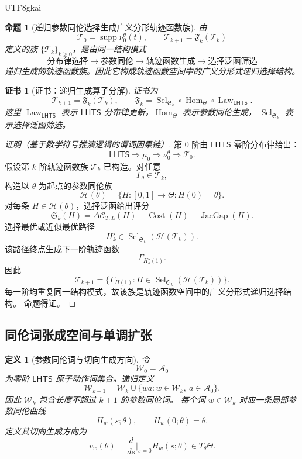 \documentclass[12pt]{article}
\newtheorem{definition}{定义}[section]
\newtheorem{proposition}{命题}[section]
\newtheorem{Certificate}{证书}[section]
\newcommand{\LHTS}{\ensuremath{\mathsf{LHTS}}}
\DeclareMathOperator{\Cost}{Cost}
\DeclareMathOperator{\JacGap}{JacGap}
\DeclareMathOperator{\Law}{Law}
\DeclareMathOperator{\Sel}{Sel}
\DeclareMathOperator{\Hom}{Hom}
\DeclareMathOperator{\supp}{supp}
\begin{document}
\begin{CJK*}{UTF8}{gkai}
\begin{proposition}[递归参数同伦选择生成广义分形轨迹函数族]
\label{prop:tex57-recursive-selection-fractal}
由
\[
  \mathcal T_0=\supp\nu_0^\theta(t),
  \qquad
  \mathcal T_{k+1}=\mathfrak F_k(\mathcal T_k)
\]
定义的族 \(\{\mathcal T_k\}_{k\ge0}\)，是由同一结构模式
\[
  \text{分布律选择}
  \to
  \text{参数同伦}
  \to
  \text{轨迹函数生成}
  \to
  \text{选择泛函筛选}
\]
递归生成的轨迹函数族。因此它构成轨迹函数空间中的广义分形式递归选择结构。
\end{proposition}

\begin{Certificate}[证书：递归生成算子分解]
\label{cert:tex57-recursive-selection-fractal}
证书为
\[
\boxed{
\mathcal T_{k+1}
=
\mathfrak F_k(\mathcal T_k),
\qquad
\mathfrak F_k
=
\Sel_{\mathfrak S_k}
\circ
\Hom_{\Theta}
\circ
\Law_{\LHTS}.
}
\]
这里 \(\Law_{\LHTS}\) 表示 \(\LHTS{}\) 分布律更新，\(\Hom_\Theta\) 表示参数同伦生成，
\(\Sel_{\mathfrak S_k}\) 表示选择泛函筛选。
\end{Certificate}

\begin{proof}[证明（基于数学符号推演逻辑的谓词因果链）]
第 \(0\) 阶由 \(\LHTS{}\) 零阶分布律给出：
\[
  \LHTS{}
  \Longrightarrow
  \mu_0
  \Longrightarrow
  \nu_0^\theta
  \Longrightarrow
  \mathcal T_0.
\]
假设第 \(k\) 阶轨迹函数族 \(\mathcal T_k\) 已构造。对任意
\[
  \Gamma_\theta\in\mathcal T_k,
\]
构造以 \(\theta\) 为起点的参数同伦族
\[
  \mathcal H(\theta)
  =
  \{H:[0,1]\to\Theta:H(0)=\theta\}.
\]
对每条 \(H\in\mathcal H(\theta)\)，选择泛函给出评分
\[
  \mathfrak S_k(H)
  =
  \Delta\mathcal C_{T,L}(H)
  -
  \Cost(H)
  -
  \JacGap(H).
\]
选择最优或近似最优路径
\[
  H_k^\star
  \in
  \Sel_{\mathfrak S_k}(\mathcal H(\mathcal T_k)).
\]
该路径终点生成下一阶轨迹函数
\[
  \Gamma_{H_k^\star(1)}.
\]
因此
\[
  \mathcal T_{k+1}
  =
  \{
  \Gamma_{H(1)}:
  H\in\Sel_{\mathfrak S_k}(\mathcal H(\mathcal T_k))
  \}.
\]
每一阶均重复同一结构模式，故该族是轨迹函数空间中的广义分形式递归选择结构。
命题得证。
\end{proof}

\subsection{同伦词张成空间与单调扩张}
\label{subsec:tex57-span-monotonicity}

\begin{definition}[参数同伦词与切向生成方向]
\label{def:tex57-homotopy-word-direction}
令
\[
  \mathcal W_0=\mathcal A_0
\]
为零阶 \(\LHTS{}\) 原子动作词集合。递归定义
\[
  \mathcal W_{k+1}
  =
  \mathcal W_k
  \cup
  \{wa:w\in\mathcal W_k,\ a\in\mathcal A_0\}.
\]
因此 \(\mathcal W_k\) 包含长度不超过 \(k+1\) 的参数同伦词。
每个词 \(w\in\mathcal W_k\) 对应一条局部参数同伦曲线
\[
  H_w(s;\theta),
  \qquad
  H_w(0;\theta)=\theta.
\]
定义其切向生成方向为
\[
  v_w(\theta)
  =
  \frac{d}{ds}\bigg|_{s=0}
  H_w(s;\theta)
  \in T_\theta\Theta.
\]
\end{definition}


\end{CJK*}
\end{document}
